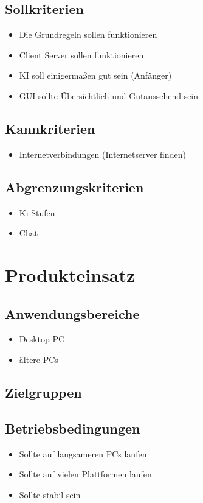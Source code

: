 \documentclass[a4paper,10pt]{article}
\begin{document}
\subsection{Sollkriterien}
\begin{itemize}
\item Die Grundregeln sollen funktionieren
\item Client Server sollen funktionieren
\item KI soll einigermaßen gut sein (Anfänger)
\item GUI sollte Übersichtlich und Gutaussehend sein
\end{itemize}
\subsection{Kannkriterien}
\begin{itemize}
\item Internetverbindungen (Internetserver finden)
\end{itemize}
\subsection{Abgrenzungskriterien}
\begin{itemize}
\item Ki Stufen
\item Chat
\end{itemize}
\section{Produkteinsatz}
\subsection{Anwendungsbereiche}
\begin{itemize}
\item Desktop-PC
\item ältere PCs
\end{itemize}
\subsection{Zielgruppen}


\subsection{Betriebsbedingungen}
\begin{itemize}
\item Sollte auf langsameren PCs laufen
\item Sollte auf vielen Plattformen laufen
\item Sollte stabil sein
\end{itemize}
\end{document}
